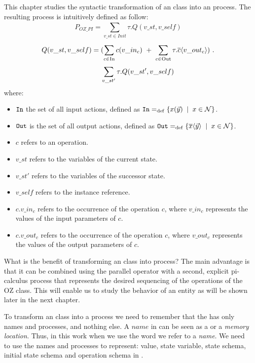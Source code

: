 This chapter studies the syntactic transformation of an \oz{} class into an \picalc{} process. The resulting process is intuitively defined as follow:
\[P_{OZ\_PI} = \sum_{v\_st\in Init}^{} \tau. Q(v\_st,v\_self)\]
\begin{equation*}
\begin{aligned}
Q(v\_st,v\_self) ={} & (\sum_{c\in \text{In}}^{} c(v\_in_{c}) \ +\ \sum_{c\in \text{Out}}^{} \tau.\out{c}{v\_out_{c}})\ . \\
      &  \sum_{v\_st'}^{} \tau.Q(v\_st',v\_self)
\end{aligned}
\end{equation*}
where:
\begin{itemize}
\item $\mathtt{In}$ the set of all input actions, defined as $\inA\define\set[x\in\names]{\inp{x}{\vec{y}}}$.
\item $\mathtt{Out}$ is the set of all output actions, defined as $\outA\define\set[x\in\names]{\out{x}{\vec{y}}}$.
\item $c$ refers to an operation.
\item $v\_st$ refers to the variables of the current state.
\item $v\_st'$ refers to the variables of the successor state.
\item $v\_self$ refers to the instance reference.
\item $c.v\_in_{c}$ refers to the occurrence of the operation $c$, where $v\_in_{c}$ represents the values of the input parameters of $c$.
\item $c.v\_out_{c}$ refers to the occurrence of the operation $c$, where $v\_out_{c}$ represents the values of the output parameters of $c$.
\end{itemize}

What is the benefit of transforming an \oz{} class into \picalc{} process? The main advantage is that it can be combined using the
parallel operator with a second, explicit pi-calculus
process that represents the desired sequencing of the operations
of the OZ class. This will enable us to study the behavior of an entity as will be shown later in the next chapter.

To transform an \oz{} class into a \picalc{} process we need to remember that the \picalc{} has only names and processes, and nothing else. A $name$ in \picalc{} can be seen as a  or a \textit{memory location}. Thus, in this work when we use the word  we refer to a \picalc{} \textit{name}. We need to use the names and processes to represent: value, state variable, state schema, initial state schema and operation schema in \picalc{}.


